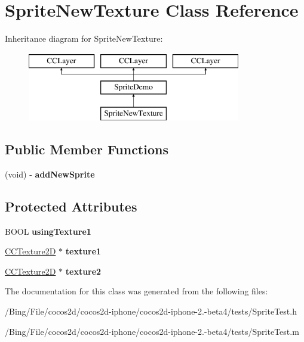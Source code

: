 \hypertarget{interface_sprite_new_texture}{\section{Sprite\-New\-Texture Class Reference}
\label{interface_sprite_new_texture}
}
Inheritance diagram for Sprite\-New\-Texture\-:\begin{figure}[H]
\begin{center}
\leavevmode
\includegraphics[height=3.000000cm]{interface_sprite_new_texture}
\end{center}
\end{figure}
\subsection*{Public Member Functions}
\begin{DoxyCompactItemize}
\item 
\hypertarget{interface_sprite_new_texture_ac55f5fa18acd045ff98b31208fac2f1f}{(void) -\/ {\bfseries add\-New\-Sprite}}\label{interface_sprite_new_texture_ac55f5fa18acd045ff98b31208fac2f1f}

\end{DoxyCompactItemize}
\subsection*{Protected Attributes}
\begin{DoxyCompactItemize}
\item 
\hypertarget{interface_sprite_new_texture_a337cafebfbfc446d09b29e434fec174e}{B\-O\-O\-L {\bfseries using\-Texture1}}\label{interface_sprite_new_texture_a337cafebfbfc446d09b29e434fec174e}

\item 
\hypertarget{interface_sprite_new_texture_a7f2a03877517b372a7505374709b6987}{\hyperlink{class_c_c_texture2_d}{C\-C\-Texture2\-D} $\ast$ {\bfseries texture1}}\label{interface_sprite_new_texture_a7f2a03877517b372a7505374709b6987}

\item 
\hypertarget{interface_sprite_new_texture_ae1a85aceeb7b4922f0d763e61f46cf9f}{\hyperlink{class_c_c_texture2_d}{C\-C\-Texture2\-D} $\ast$ {\bfseries texture2}}\label{interface_sprite_new_texture_ae1a85aceeb7b4922f0d763e61f46cf9f}

\end{DoxyCompactItemize}


The documentation for this class was generated from the following files\-:\begin{DoxyCompactItemize}
\item 
/\-Bing/\-File/cocos2d/cocos2d-\/iphone/cocos2d-\/iphone-\/2.-\/beta4/tests/Sprite\-Test.\-h\item 
/\-Bing/\-File/cocos2d/cocos2d-\/iphone/cocos2d-\/iphone-\/2.-\/beta4/tests/Sprite\-Test.\-m\end{DoxyCompactItemize}

